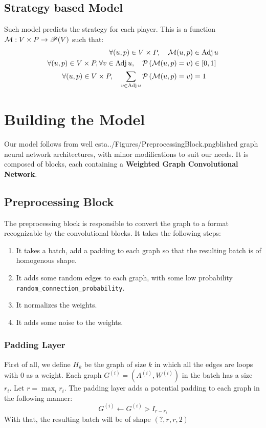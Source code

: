 \subsection{Strategy based Model}
Such model predicts the strategy for each player.
\newline This is a function $\mathcal{M}:V \times P \rightarrow \mathscr{P}(V)$ such that:
\begin{align*}
	\forall (u,p)\in V \times P, \quad \mathcal{M}(u,p) &\in \operatorname{Adj} u \\
	\forall (u,p) \in V \times P,\forall v \in \operatorname{Adj} u, \quad  \mathcal{P}\left(\mathcal{M}(u,p) =v \right)  &\in [0,1] \\ 
\forall (u,p) \in V \times P, \quad  \sum_{v\in \operatorname{Adj} u}\mathcal{P}\left(\mathcal{M}(u,p) =v \right) &=1 \\ 
\end{align*}
\section{Building the Model}
Our model follows from well esta../Figures/PreprocessingBlock.pngblished graph neural network architectures, with minor modifications to suit our needs.
\newline It is composed of blocks, each containing a \textbf{Weighted Graph Convolutional Network}.

\subsection{Preprocessing Block}
The preprocessing block is responsible to convert the graph to a format recognizable by the convolutional blocks.
\newline It takes the following steps:
\begin{enumerate}
	\item It takes a batch, add a padding to each graph so that the resulting batch is of homogenous shape.
	\item It adds some random edges to each graph, with some low probability \texttt{random\_connection\_probability}.
	\item It normalizes the weights.
	\item It adds some noise to the weights.
\end{enumerate} 

\subsubsection{Padding Layer}
First of all, we define $H_k$ be the graph of size $k$ in which all the edges are loops with $0$ as a weight. 
\newline Each graph $G^{(i)}=(A^{(i)},W^{(i)})$ in the batch has a size $r_i.$ 
\newline Let $r=\max_i r_i.$ The padding layer adds a potential padding to each graph in the following manner:
\begin{equation*}
	G^{(i)}\leftarrow G^{(i)} \rhd I_{r-r_i}
\end{equation*}
With that, the resulting batch will be of shape $(?,r,r,2)$
